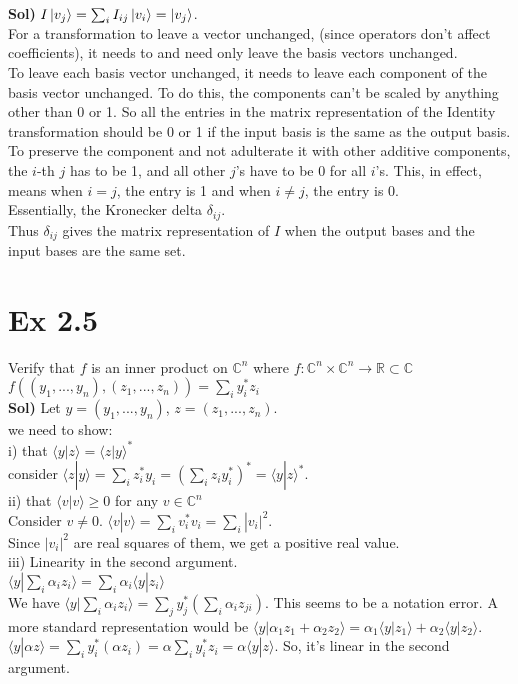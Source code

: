 \documentclass{article}
\newcommand{\0}{{$|0\rangle$}}
\newcommand{\1}{{$|1\rangle$}}
\begin{document}
\textbf{Sol)} $I\ket{v_j} = \sum_i I_{ij}\ket{v_i} = \ket{v_j}$. \\
For a transformation to leave a vector unchanged, (since operators don't affect coefficients), it needs to and need only leave the basis vectors unchanged. \\
To leave each basis vector unchanged, it needs to leave each component of the basis vector unchanged. To do this, the components can't be scaled by anything other than 0 or 1. So all the entries in the matrix representation of the Identity transformation should be 0 or 1 if the input basis is the same as the output basis. \\
To preserve the component and not adulterate it with other additive components, the $i$-th $j$ has to be 1, and all other $j$'s have to be 0 for all $i$'s. This, in effect, means when $i=j$, the entry is 1 and when $i \neq j$, the entry is 0. \\
Essentially, the Kronecker delta $\delta_{ij}$. \\
Thus $\delta_{ij}$ gives the matrix representation of $I$ when the output bases and the input bases are the same set.

\newpage

\section*{Ex 2.5}

Verify that $f$ is an inner product on $\mathbb{C}^n$ where $f: \mathbb{C}^n \times \mathbb{C}^n \to \mathbb{R} \subset \mathbb{C}$ \\
$f((y_1, ..., y_n), (z_1, ..., z_n)) = \sum_i y_i^* z_i$ \\
\textbf{Sol)} Let $y = (y_1, ..., y_n)$, $z = (z_1, ..., z_n)$. \\
we need to show: \\
i) that $\langle y | z \rangle = \langle z | y \rangle^*$ \\
consider $\langle z | y \rangle = \sum_i z_i^* y_i = (\sum_i z_i y_i^*)^* = \langle y | z \rangle^*$. \\
ii) that $\langle v | v \rangle \ge 0$ for any $v \in \mathbb{C}^n$ \\
Consider $v \ne 0$. $\langle v | v \rangle = \sum_i v_i^* v_i = \sum_i |v_i|^2$. \\
Since $|v_i|^2$ are real squares of them, we get a positive real value. \\
iii) Linearity in the second argument. \\
$\langle y | \sum_i \alpha_i z_i \rangle = \sum_i \alpha_i \langle y | z_i \rangle$ \\
We have $\langle y | \sum_i \alpha_i z_i \rangle = \sum_j y_j^* (\sum_i \alpha_i z_{ji})$.
This seems to be a notation error. A more standard representation would be $\langle y | \alpha_1 z_1 + \alpha_2 z_2 \rangle = \alpha_1 \langle y | z_1 \rangle + \alpha_2 \langle y | z_2 \rangle$.
$\langle y | \alpha z \rangle = \sum_i y_i^* (\alpha z_i) = \alpha \sum_i y_i^* z_i = \alpha \langle y | z \rangle$.
So, it's linear in the second argument.
\end{document}
